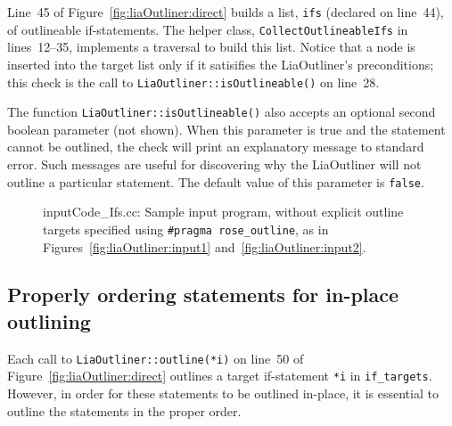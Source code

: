 Line~45 of Figure~\ref{fig:liaOutliner:direct} builds a list,
\texttt{ifs} (declared on line~44), of outlineable if-statements.  The
helper class, \texttt{CollectOutlineableIfs} in lines~12--35,
implements a traversal to build this list. Notice that a node is
inserted into the target list only if it satisifies the LiaOutliner's
preconditions; this check is the call to
\texttt{LiaOutliner::isOutlineable()} on line~28.

The function \texttt{LiaOutliner::isOutlineable()} also accepts an
optional second boolean parameter (not shown). When this parameter is
true and the statement cannot be outlined, the check will print an
explanatory message to standard error. Such messages are useful for
discovering why the LiaOutliner will not outline a particular
statement. The default value of this parameter is \texttt{false}.

\begin{figure}[!h]
{\indent
{\mySmallFontSize
\begin{latexonly}
   
\end{latexonly}
\begin{htmlonly}
   
\end{htmlonly}

}
}
\caption{inputCode\_Ifs.cc: Sample input program, without explicit
outline targets specified using \texttt{\#pragma rose\_outline}, as in
Figures~\ref{fig:liaOutliner:input1}
and~\ref{fig:liaOutliner:input2}.}
\label{fig:liaOutliner:input3}
\end{figure}

\subsection{Properly ordering statements for in-place outlining}
\label{sec:liaOutliner:direct:ordering}

Each call to \texttt{LiaOutliner::outline(*i)} on line~50 of
Figure~\ref{fig:liaOutliner:direct} outlines a target if-statement
\texttt{*i} in \texttt{if\_targets}. However, in order for these
statements to be outlined in-place, it is essential to outline the
statements in the proper order.

